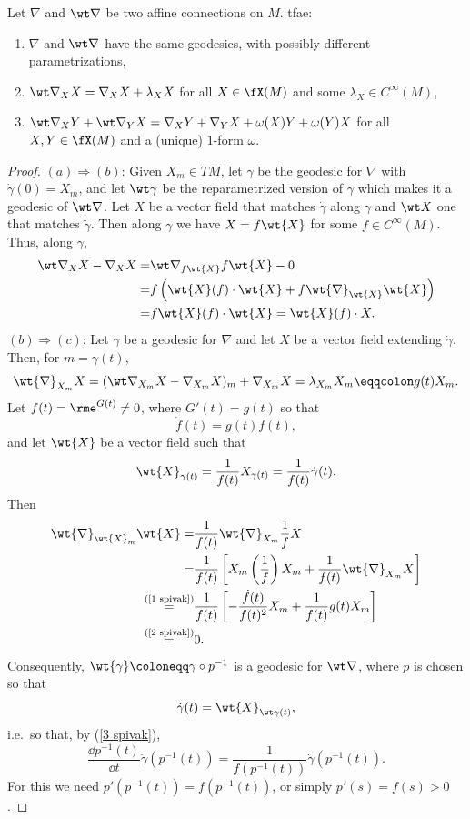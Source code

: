 \begin{prop}
    Let $\nabla$ and $\wt\nabla$ be two affine connections on $M$. \gls{tfae}:
    \begin{enumerate}[label=(\alph*)]
        \item $\nabla$ and $\wt\nabla$ have the same geodesics, with possibly different parametrizations,
        \item $\wt\nabla_X X=\nabla_X X+\lambda_X X$ for all $X\in \fX(M)$ and some $\lambda_X\in C^\infty(M)$,
        \item $\wt\nabla_X Y+\wt\nabla_Y X=\nabla_X Y+\nabla_Y X+\omega(X)Y+\omega(Y)X$ for all $X,Y\in\fX(M)$ and a (unique) $1$-form $\omega$.
    \end{enumerate}    
\end{prop}
\begin{proof}
    $(a)\Rightarrow(b)$: Given $X_m\in TM$, let $\gamma$  be the geodesic for $\nabla$ with $\dot\gamma(0)=X_m$, and let $\wt\gamma$ be the reparametrized version of $\gamma$ which makes it a geodesic of $\wt\nabla$. Let $X$ be a vector field that matches $\dot\gamma$ along $\gamma$ and $\wt X$ one that matches $\dot{\tilde\gamma}$. Then along $\gamma$ we have $X=f\wt{X}$ for some $f\in C^\infty(M)$. Thus, along $\gamma$,
    \begin{align}
        \wt\nabla_X X-\nabla_X X=& \wt\nabla_{f\wt{X}}f\wt{X}-0\\
        =& f\left(\wt{X}(f)\cdot \wt{X}+f\wt{\nabla}_{\wt{X}}\wt{X}\right)\\
        =& f\wt{X}(f)\cdot \wt{X}=\wt{X}(f)\cdot X.
    \end{align}
    $(b)\Rightarrow(c)$: Let $\gamma$ be a geodesic for $\nabla$ and let $X$ be a vector field extending $\dot\gamma$. Then, for $m=\gamma(t)$,
    \[\wt{\nabla}_{X_m}X=(\wt\nabla_{X_m} X-\nabla_{X_m} X)_m+\nabla_{X_m}X=\lambda_{X_m}X_m\eqqcolon g(t)X_m.\label{1 spivak}\]
    Let $f(t)=\rme^{G(t)}\neq 0$, where $G'(t)=g(t)$ so that 
    \[\dot f(t)=g(t)f(t),\label{2 spivak}\] 
    and let $\wt{X}$ be a vector field such that 
    \[\wt{X}_{\gamma(t)}=\frac{1}{f(t)}X_{\gamma(t)}=\frac{1}{f(t)}\dot\gamma(t).\label{3 spivak}\]
    Then 
    \begin{align}
        \wt{\nabla}_{\wt{X}_m}\wt{X}=& \frac{1}{f(t)}\wt{\nabla}_{X_m}\frac{1}{f}X\\
        =& \frac{1}{f(t)}\left[X_m\left(\frac{1}{f}\right)X_m+\frac{1}{f(t)}\wt{\nabla}_{X_m}X\right]\\
        \overset{\text{(\ref{1 spivak})}}{=}&\frac{1}{f(t)}\left[-\frac{\dot f(t)}{f(t)^2}X_m+\frac{1}{f(t)}g(t)X_m\right]\\
        \overset{\text{(\ref{2 spivak})}}{=}& 0.
    \end{align}
    Consequently, $\wt{\gamma}\coloneqq \gamma\circ p^{-1}$ is a geodesic for $\wt\nabla$, where $p$ is chosen so that 
    \[\dot\gamma(t)=\wt{X}_{\wt\gamma(t)},\]
    i.e.\ so that, by (\ref{3 spivak}),
    \[\frac{\dd p^{-1}(t)}{\dd t}\dot\gamma(p^{-1}(t))=\frac{1}{f(p^{-1}(t))}\dot\gamma(p^{-1}(t)).\]
    For this we need $p'(p^{-1}(t))=f(p^{-1}(t))$, or simply $p'(s)=f(s)>0$.


\end{proof}
